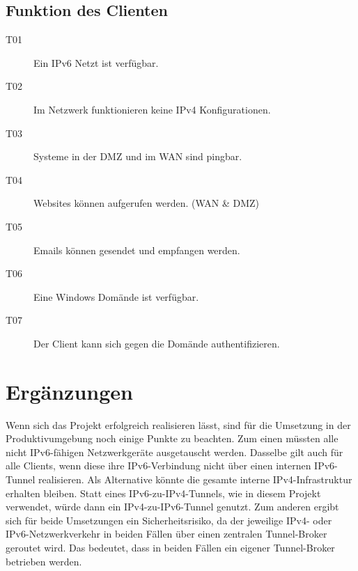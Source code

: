 \subsection{Funktion des Clienten}
\begin{description}
\item [T01] Ein IPv6 Netzt ist verfügbar.
\item [T02] Im Netzwerk funktionieren keine IPv4 Konfigurationen.
\item [T03] Systeme in der DMZ und im WAN sind pingbar.
\item [T04] Websites können aufgerufen werden. (WAN & DMZ)
\item [T05] Emails können gesendet und empfangen werden.
\item [T06] Eine Windows Domände ist verfügbar.
\item [T07] Der Client kann sich gegen die Domände authentifizieren.
\end{description}



\section{Ergänzungen}



Wenn sich das Projekt erfolgreich realisieren lässt, sind für die Umsetzung in der Produktivumgebung noch einige Punkte zu beachten. Zum einen müssten alle nicht IPv6-fähigen Netzwerkgeräte ausgetauscht werden. Dasselbe gilt auch für alle Clients, wenn diese ihre IPv6-Verbindung nicht über einen internen IPv6-Tunnel realisieren. Als Alternative könnte die gesamte interne IPv4-Infrastruktur erhalten bleiben. Statt eines IPv6-zu-IPv4-Tunnels, wie in diesem Projekt verwendet, würde dann ein IPv4-zu-IPv6-Tunnel genutzt. Zum anderen ergibt sich für beide Umsetzungen ein Sicherheitsrisiko, da der jeweilige IPv4- oder IPv6-Netzwerkverkehr in beiden Fällen über einen zentralen Tunnel-Broker geroutet wird. Das bedeutet, dass in beiden Fällen ein eigener Tunnel-Broker betrieben werden.